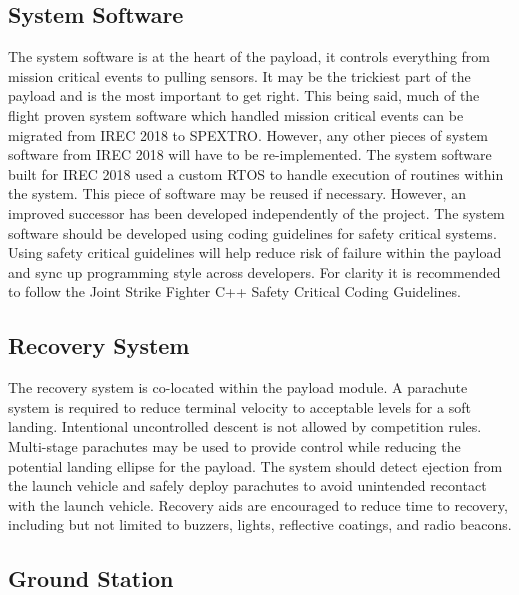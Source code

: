 \documentclass[conference]{IEEEtran} %
\begin{document}
\subsection{System Software}
\label{subsec:sysware}

The system software is at the heart of the payload, it controls everything from mission critical events to pulling sensors. It may be the trickiest part of the payload and is the most important to get right. This being said, much of the flight proven system software which handled mission critical events can be migrated from IREC 2018 to SPEXTRO. However, any other pieces of system software from IREC 2018 will have to be re-implemented. The system software built for IREC 2018 used a custom RTOS to handle execution of routines within the system. This piece of software may be reused if necessary. However, an improved successor has been developed independently of the project. The system software should be developed using coding guidelines for safety critical systems. Using safety critical guidelines will help reduce risk of failure within the payload and sync up programming style across developers. For clarity it is recommended to follow the Joint Strike Fighter C++ Safety Critical Coding Guidelines. 

\subsection{Recovery System}
\label{subsec:recovery}

The recovery system is co-located within the payload module. A parachute system is required to reduce terminal velocity to acceptable levels for a soft landing. Intentional uncontrolled descent is not allowed by competition rules. Multi-stage parachutes may be used to provide control while reducing the potential landing ellipse for the payload. The system should detect ejection from the launch vehicle  and safely deploy parachutes to avoid unintended recontact with the launch vehicle. Recovery aids are encouraged to reduce time to recovery, including but not limited to buzzers, lights, reflective coatings, and radio beacons.

\subsection{Ground Station}
\label{subsec:ground}
\end{document}
